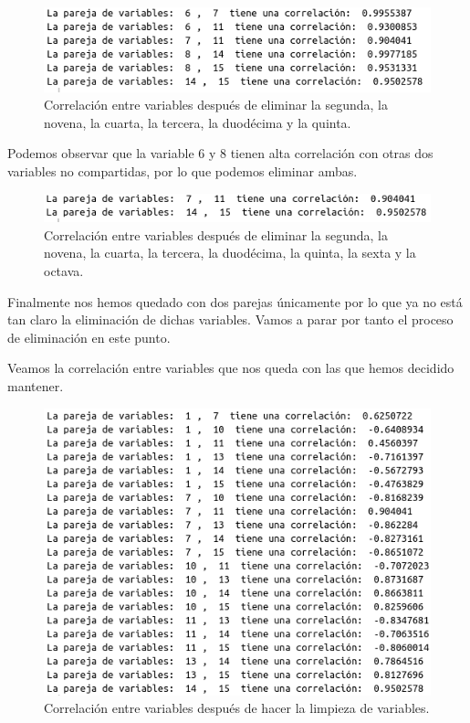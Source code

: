 \documentclass[12pt,a4paper]{article}
\begin{document}
\begin{figure}[H]
	\centering
	\includegraphics[scale=0.6]{./Imagenes/EDA/Regresion/correlacion_entre_variables6.png}
	\caption{Correlación entre variables después de eliminar la segunda, la novena, la cuarta, la tercera, la duodécima y la quinta.}
\end{figure}

Podemos observar que la variable 6 y 8 tienen alta correlación con otras dos variables no compartidas, por lo que podemos eliminar ambas.

\begin{figure}[H]
	\centering
	\includegraphics[scale=0.6]{./Imagenes/EDA/Regresion/correlacion_entre_variables7.png}
	\caption{Correlación entre variables después de eliminar la segunda, la novena, la cuarta, la tercera, la duodécima, la quinta, la sexta y la octava.}
\end{figure}

Finalmente nos hemos quedado con dos parejas únicamente por lo que ya no está tan claro la  eliminación de dichas variables. Vamos a parar por tanto el proceso de eliminación en este punto.

Veamos la correlación entre variables que nos queda con las que hemos decidido mantener.

\begin{figure}[H]
	\centering
	\includegraphics[scale=0.6]{./Imagenes/EDA/Regresion/correlacion_entre_variables8.png}
	\caption{Correlación entre variables después de hacer la limpieza de variables.}
\end{figure}
\end{document}
